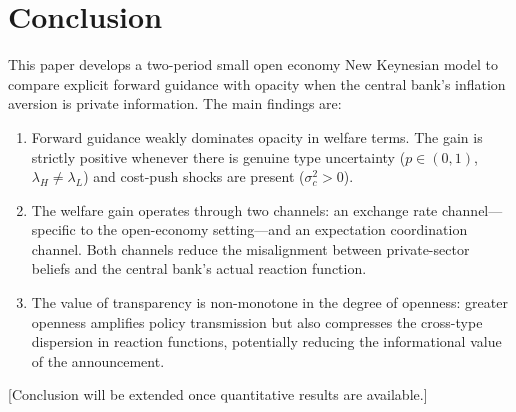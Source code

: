 
\section{Conclusion}
\label{sec:conclusion}

This paper develops a two-period small open economy New Keynesian model to compare
explicit forward guidance with opacity when the central bank's inflation aversion is
private information. The main findings are:

\begin{enumerate}[label=(\roman*)]
  \item Forward guidance weakly dominates opacity in welfare terms. The gain is
        strictly positive whenever there is genuine type uncertainty
        ($p \in (0,1)$, $\lambda_H \neq \lambda_L$) and cost-push shocks are present
        ($\sigma_c^2 > 0$).

  \item The welfare gain operates through two channels: an exchange rate channel---
        specific to the open-economy setting---and an expectation coordination channel.
        Both channels reduce the misalignment between private-sector beliefs and the
        central bank's actual reaction function.

  \item The value of transparency is non-monotone in the degree of openness: greater
        openness amplifies policy transmission but also compresses the cross-type
        dispersion in reaction functions, potentially reducing the informational value
        of the announcement.
\end{enumerate}

[Conclusion will be extended once quantitative results are available.]
